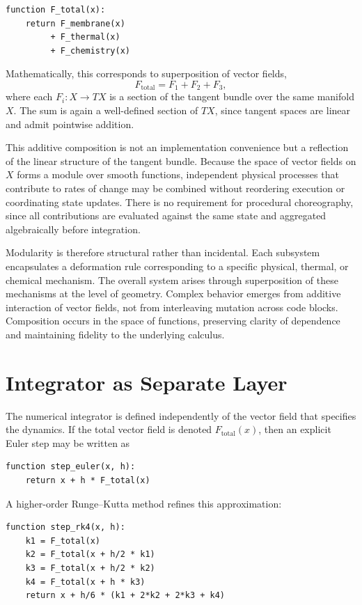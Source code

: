 \documentclass[12pt]{book}
\begin{document}
\begin{verbatim}
function F_total(x):
    return F_membrane(x)
         + F_thermal(x)
         + F_chemistry(x)
\end{verbatim}

Mathematically, this corresponds to superposition of vector fields,
\[
F_{\text{total}} = F_1 + F_2 + F_3,
\]
where each $F_i : X \to TX$ is a section of the tangent bundle over the
same manifold $X$. The sum is again a well-defined section of $TX$,
since tangent spaces are linear and admit pointwise addition.

This additive composition is not an implementation convenience but a
reflection of the linear structure of the tangent bundle. Because the
space of vector fields on $X$ forms a module over smooth functions,
independent physical processes that contribute to rates of change may
be combined without reordering execution or coordinating state
updates. There is no requirement for procedural choreography, since
all contributions are evaluated against the same state and aggregated
algebraically before integration.

Modularity is therefore structural rather than incidental. Each
subsystem encapsulates a deformation rule corresponding to a specific
physical, thermal, or chemical mechanism. The overall system arises
through superposition of these mechanisms at the level of geometry.
Complex behavior emerges from additive interaction of vector fields,
not from interleaving mutation across code blocks. Composition occurs
in the space of functions, preserving clarity of dependence and
maintaining fidelity to the underlying calculus.

\section{Integrator as Separate Layer}

The numerical integrator is defined independently of the vector field
that specifies the dynamics. If the total vector field is denoted
$F_{\text{total}}(x)$, then an explicit Euler step may be written as

\begin{verbatim}
function step_euler(x, h):
    return x + h * F_total(x)
\end{verbatim}

A higher-order Runge--Kutta method refines this approximation:

\begin{verbatim}
function step_rk4(x, h):
    k1 = F_total(x)
    k2 = F_total(x + h/2 * k1)
    k3 = F_total(x + h/2 * k2)
    k4 = F_total(x + h * k3)
    return x + h/6 * (k1 + 2*k2 + 2*k3 + k4)
\end{verbatim}
\end{document}
